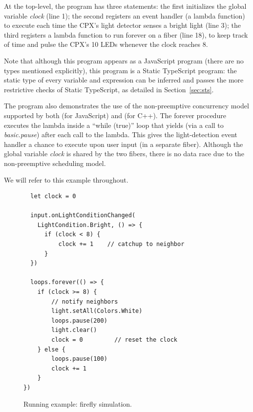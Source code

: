 At the top-level, the program has three statements:
the first initializes the global variable \emph{clock} (line 1); the
second registers an event handler (a lambda function) to execute
each time the CPX's light detector senses a bright light (line 3); the
third registers a lambda function to run forever on a fiber (line 18),
to keep track of time and pulse the CPX's 10 LEDs whenever the
clock reaches 8.

Note that although this program appears as a JavaScript program (there are no
types mentioned explicitly), this program is a Static TypeScript program:
the static type of every variable and expression
can be inferred and passes the more restrictive checks
of Static TypeScript, as detailed in Section~\ref{sec:sts}.

The program also demonstrates the use of the non-preemptive concurrency
model supported by both \MC (for JavaScript) and \CO (for C++).
The forever procedure executes the lambda inside a ``while (true)''
loop that yields (via a call to \emph{basic.pause}) after each call to the lambda.
This gives the light-detection event handler a chance to execute
upon user input (in a separate fiber). Although the global variable \emph{clock} is
shared by the two fibers, there is no data race due to the non-preemptive
scheduling model.

We will refer to this example throughout.

\begin{figure}
\begin{lstlisting}
  let clock = 0

  input.onLightConditionChanged(
    LightCondition.Bright, () => {
      if (clock < 8) {
          clock += 1    // catchup to neighbor
      }
  })

  loops.forever(() => {
    if (clock >= 8) {
        // notify neighbors
        light.setAll(Colors.White)
        loops.pause(200)
        light.clear()
        clock = 0         // reset the clock
    } else {
        loops.pause(100)
        clock += 1
    }
})
\end{lstlisting}
\caption{\label{fig:example}Running example: firefly simulation.}
\end{figure}